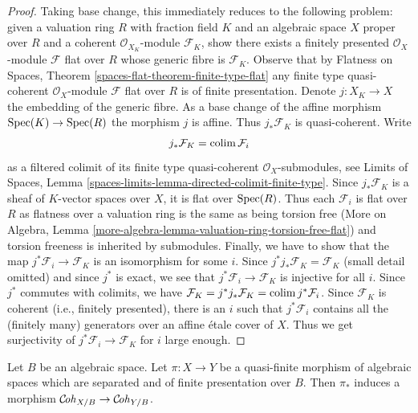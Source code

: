 \begin{proof}
Taking base change, this immediately reduces to the following
problem: given a valuation ring $R$ with fraction field $K$ and
an algebraic space $X$ proper over $R$ and a coherent
$\mathcal{O}_{X_K}$-module $\mathcal{F}_K$, show there exists
a finitely presented $\mathcal{O}_X$-module $\mathcal{F}$
flat over $R$ whose generic fibre is $\mathcal{F}_K$.
Observe that by Flatness on Spaces, Theorem
\ref{spaces-flat-theorem-finite-type-flat}
any finite type quasi-coherent $\mathcal{O}_X$-module
$\mathcal{F}$ flat over $R$ is of finite presentation.
Denote $j : X_K \to X$ the embedding of the generic fibre.
As a base change of the affine morphism $\mathop{\mathrm{Spec}}(K) \to \mathop{\mathrm{Spec}}(R)$
the morphism $j$ is affine. Thus $j_*\mathcal{F}_K$ is
quasi-coherent. Write
$$
j_*\mathcal{F}_K = \mathop{\mathrm{colim}}\nolimits \mathcal{F}_i
$$
as a filtered colimit of its finite type quasi-coherent
$\mathcal{O}_X$-submodules, see
Limits of Spaces, Lemma \ref{spaces-limits-lemma-directed-colimit-finite-type}.
Since $j_*\mathcal{F}_K$ is a sheaf of $K$-vector spaces over $X$,
it is flat over $\mathop{\mathrm{Spec}}(R)$. Thus each $\mathcal{F}_i$ is flat
over $R$ as flatness over a valuation ring is the same as being
torsion free
(More on Algebra, Lemma
\ref{more-algebra-lemma-valuation-ring-torsion-free-flat})
and torsion freeness is inherited by submodules.
Finally, we have to show that the map
$j^*\mathcal{F}_i \to \mathcal{F}_K$
is an isomorphism for some $i$.
Since $j^*j_*\mathcal{F}_K = \mathcal{F}_K$ (small detail omitted)
and since $j^*$ is exact, we see that $j^*\mathcal{F}_i \to \mathcal{F}_K$
is injective for all $i$.
Since $j^*$ commutes with colimits, we have
$\mathcal{F}_K = j^*j_*\mathcal{F}_K = \mathop{\mathrm{colim}}\nolimits j^*\mathcal{F}_i$.
Since $\mathcal{F}_K$ is coherent (i.e., finitely presented),
there is an $i$ such that $j^*\mathcal{F}_i$ contains all the
(finitely many) generators over an affine \'etale cover of $X$.
Thus we get surjectivity of $j^*\mathcal{F}_i \to \mathcal{F}_K$
for $i$ large enough.
\end{proof}

\begin{lemma}
\label{lemma-coherent-functorial}
Let $B$ be an algebraic space. Let $\pi : X \to Y$ be a quasi-finite
morphism of algebraic spaces which are separated and of finite presentation
over $B$. Then $\pi_*$ induces a morphism
$\mathcal{C}\!\mathit{oh}_{X/B} \to \mathcal{C}\!\mathit{oh}_{Y/B}$.
\end{lemma}

